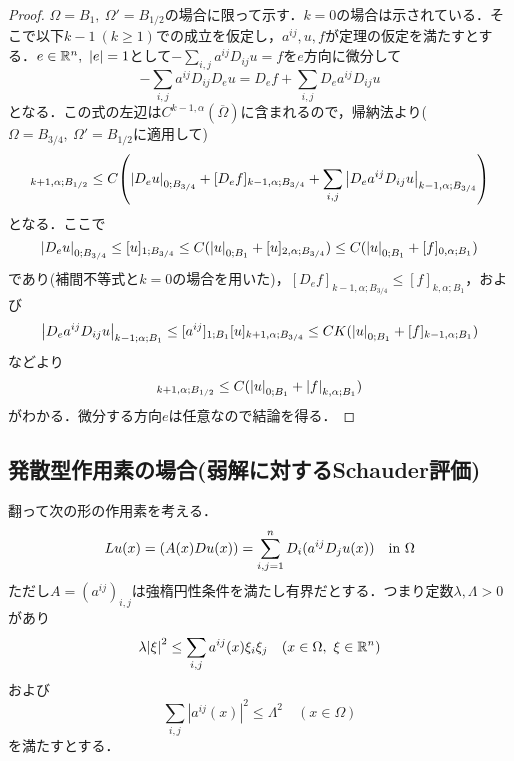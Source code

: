 \documentclass[a4paper]{ltjsarticle}
\newcommand{\Rset}{\mathbb{R}}
\newcommand{\Om}{\Omega}
\newcommand{\Ombar}{\overline{\Omega}}
\newcommand{\inn}{\quad\text{in}\ }
\newcommand{\1}{\mathbbm{1}}
\let\div\relax
\DeclareMathOperator{\div}{\mathrm{div}}
\numberwithin{equation}{section}
\theoremstyle{definition}
\begin{document}
\begin{proof}
    $\Om=B_1,\ \Om'=B_{1/2}$の場合に限って示す．$k=0$の場合は示されている．そこで以下$k-1\ (k\geq1)$での成立を仮定し，$a^{ij},u,f$が定理の仮定を満たすとする．$e\in\Rset^n,\ \abs{e}=1$として$-\sum_{i,j}a^{ij}D_{ij}u=f$を$e$方向に微分して
    \begin{equation}
        -\sum_{i,j}a^{ij}D_{ij}D_eu=D_ef+\sum_{i,j}D_ea^{ij}D_{ij}u
    \end{equation}
    となる．この式の左辺は$C^{k-1,\alpha}(\Ombar)$に含まれるので，帰納法より($\Om=B_{3/4},\ \Om'=B_{1/2}$に適用して)
    \begin{equation}
        [D_eu]_{k+1,\alpha;B_{1/2}}\leq C\qty(\abs{D_eu}_{0;B_{3/4}}+[D_ef]_{k-1,\alpha;B_{3/4}}+\sum_{i,j}\abs{D_ea^{ij}D_{ij}u}_{k-1,\alpha;B_{3/4}})
    \end{equation}
    となる．ここで
    \begin{equation}
        \abs{D_eu}_{0;B_{3/4}}\leq [u]_{1;B_{3/4}}\leq C(\abs{u}_{0;B_1}+[u]_{2,\alpha;B_{3/4}})\leq C(\abs{u}_{0;B_1}+[f]_{0,\alpha;B_1}) 
    \end{equation}
    であり(補間不等式と$k=0$の場合を用いた)，$[D_ef]_{k-1,\alpha;B_{3/4}}\leq [f]_{k,\alpha;B_{1}}$，および
    \begin{equation}
        \abs{D_{e}a^{ij}D_{ij}u}_{k-1;\alpha;B_1}\leq [a^{ij}]_{1;B_1}[u]_{k+1,\alpha;B_{3/4}}\leq CK(\abs{u}_{0;B_1}+[f]_{k-1,\alpha;B_1})
    \end{equation}
    などより
    \begin{equation}
        [D_eu]_{k+1,\alpha;B_{1/2}}\leq C(\abs{u}_{0;B_1}+\abs{f}_{k,\alpha;B_1})
    \end{equation}
    がわかる．微分する方向$e$は任意なので結論を得る．
\end{proof}
\subsection{発散型作用素の場合(弱解に対するSchauder評価)}
翻って次の形の作用素を考える．
\begin{equation}
    Lu(x)=\div (A(x)Du(x))=\sum_{i,j=1}^n D_i(a^{ij}D_ju(x))\inn\Om
\end{equation}
ただし$A=(a^{ij})_{i,j}$は強楕円性条件を満たし有界だとする．つまり定数$\lambda,\Lambda>0$があり
\begin{equation}
    \lambda \abs{\xi}^2\leq \sum_{i,j}a^{ij}(x)\xi_i\xi_j\quad (x\in \Om,\ \xi\in\Rset^n)
\end{equation}
および
\begin{equation}
    \sum_{i,j}|a^{ij}(x)|^2\leq \Lambda^2\quad (x\in\Om ) 
\end{equation}
を満たすとする．
\end{document}
